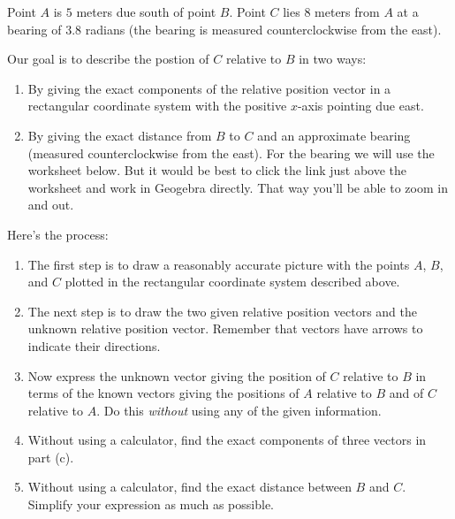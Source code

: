 \documentclass{ximera}
\begin{document}
\begin{question}  \label{Q9dfrwDSFD}
Point $A$ is $5$ meters due south of point $B$. Point $C$ lies $8$ meters from $A$ at a bearing of $3.8$ radians (the bearing is measured counterclockwise from the east).

Our goal is to describe the postion of $C$ relative to $B$ in two ways:
\begin{enumerate}
\item By giving the exact components of the relative position vector in a rectangular coordinate system with the positive $x$-axis pointing due east.

\item By giving the exact distance from $B$ to $C$ and an approximate bearing (measured counterclockwise from the east). For the bearing we will use the worksheet below. But it would be best to click the link just above the worksheet and work in Geogebra directly. That way you'll be able to zoom in and out.
\end{enumerate}



Here's the process:

\begin{enumerate}

\item The first step is to draw a reasonably accurate picture with the points $A$, $B$, and $C$ plotted in the rectangular coordinate system described above.

\item The next step is to draw the two given relative position vectors and the unknown relative position vector. Remember that vectors have arrows to indicate their directions.

\item Now express the unknown vector giving the position of $C$ relative to $B$ in terms of the known vectors giving the positions of $A$ relative to $B$ and of $C$ relative to $A$. Do this \emph{without} using any of the given information.

\item Without using a calculator, find the exact components of three vectors in part (c).

\item Without using a calculator, find the exact distance between $B$ and $C$. Simplify your expression as much as possible.


\end{enumerate}
\end{question}
\end{document}
